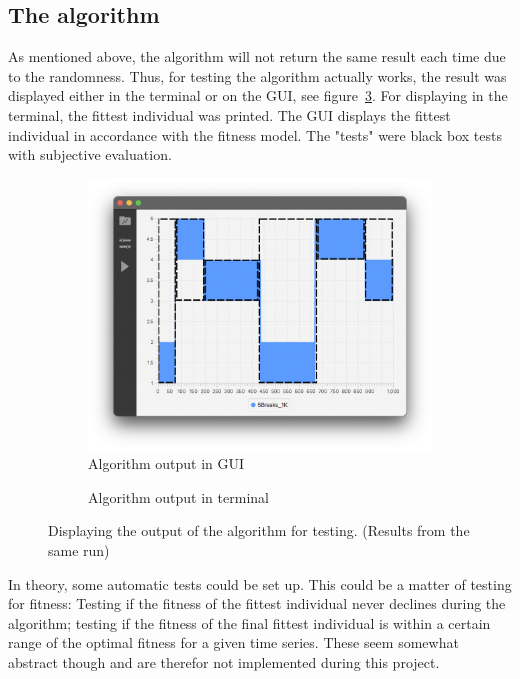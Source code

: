 \subsection{The algorithm} \label{sec:test-the-algorithm}

As mentioned above, the algorithm will not return the same result each time due
to the randomness. Thus, for testing the algorithm actually works, the result
was displayed either in the terminal or on the GUI, see
figure~\ref{fig:bp-locations}. For displaying in the
terminal, the fittest individual was printed. The GUI displays the fittest
individual in accordance with the fitness model. The "tests" were black box
tests with subjective evaluation. 

\begin{figure}[ht]
    \centering
    \begin{subfigure}[b]{.48\textwidth}
        \centering
        \includegraphics[width=\textwidth]{fig/bp-locations-gui.png}
        \caption{Algorithm output in GUI}
        \label{fig:bp-locations-gui}
    \end{subfigure}
    \hfill
    \begin{subfigure}[b]{.48\textwidth}
        \centering
        \caption{Algorithm output in terminal}
        \label{fig:bp-locations-term}
    \end{subfigure}
    \caption{Displaying the output of the algorithm for testing. (Results from the same run)}
    \label{fig:bp-locations}
\end{figure}

In theory, some automatic tests could be set up. This could be a matter of
testing for fitness: Testing if the fitness of the fittest individual never
declines during the algorithm; testing if the fitness of the final fittest
individual is within a certain range of the optimal fitness for a given time
series. These seem somewhat abstract though and are therefor not implemented
during this project. 